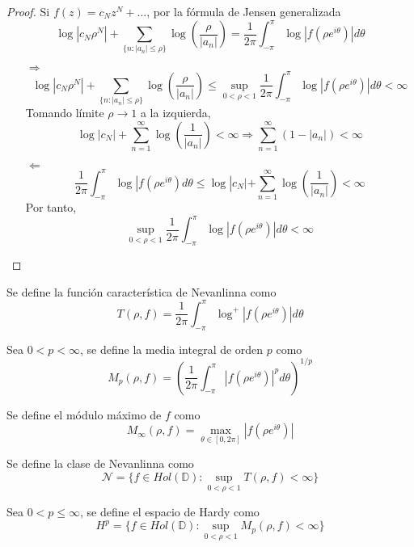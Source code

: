 \begin{proof}
    Si $f(z) = c_Nz^N + \dots$, por la fórmula de Jensen generalizada
    $$\log|c_N\rho^N| + \sum_{\{n : |a_n|\leq\rho\}} \log\left(\frac{\rho}{|a_n|}\right) = \frac{1}{2\pi} \int_{-\pi}^\pi \log|f(\rho e^{i\theta})|d\theta$$
    \begin{itemize}
        \item[$\Rightarrow$] $$\log|c_N\rho^N| + \sum_{\{n : |a_n|\leq\rho\}} \log\left(\frac{\rho}{|a_n|}\right) \leq \sup_{0<\rho<1} \frac{1}{2\pi} \int_{-\pi}^\pi \log|f(\rho e^{i\theta})|d\theta < \infty$$
            Tomando límite $\rho \to 1$ a la izquierda,
            $$\log|c_N| + \sum_{n=1}^\infty \log\left(\frac{1}{|a_n|}\right) < \infty \Rightarrow \sum_{n=1}^\infty (1-|a_n|) < \infty$$
        \item[$\Leftarrow$] $$\frac{1}{2\pi} \int_{-\pi}^\pi \log|f(\rho e^{i\theta})d\theta \leq \log|c_N| + \sum_{n=1}^\infty \log\left(\frac{1}{|a_n|}\right) < \infty$$
            Por tanto,
            $$\sup_{0<\rho<1} \frac{1}{2\pi} \int_{-\pi}^\pi \log|f(\rho e^{i\theta})|d\theta < \infty$$
    \end{itemize}
\end{proof}

\begin{definition}
    Se define la función característica de Nevanlinna como
    $$T(\rho, f) = \frac{1}{2\pi} \int_{-\pi}^\pi \log^+|f(\rho e^{i\theta})|d\theta$$
\end{definition}

\begin{definition}
    Sea $0 < p < \infty$, se define la media integral de orden $p$ como
    $$M_p(\rho, f) = \left(\frac{1}{2\pi} \int_{-\pi}^\pi |f(\rho e^{i\theta})|^pd\theta\right)^{1/p}$$
\end{definition}

\begin{definition}
    Se define el módulo máximo de $f$ como
    $$M_\infty(\rho, f) = \max_{\theta \in [0, 2\pi]} |f(\rho e^{i\theta})|$$
\end{definition}

\begin{definition}
    Se define la clase de Nevanlinna como
    $$\mathcal{N} = \{f \in Hol(\mathbb{D}) : \sup_{0<\rho<1} T(\rho, f) < \infty\}$$
\end{definition}

\begin{definition}
    Sea $0 < p \leq \infty$, se define el espacio de Hardy como
    $$H^p = \{f \in Hol(\mathbb{D}) : \sup_{0<\rho<1} M_p(\rho, f) < \infty\}$$
\end{definition}

